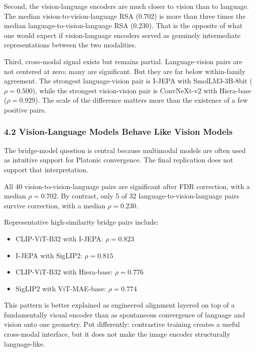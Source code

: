 \documentclass[
]{article}
\providecommand{\tightlist}{%
  \setlength{\itemsep}{0pt}\setlength{\parskip}{0pt}}
\begin{document}
Second, the vision-language encoders are much closer to vision than to
language. The median vision-to-vision-language RSA (0.702) is more than
three times the median language-to-vision-language RSA (0.230). That is
the opposite of what one would expect if vision-language encoders served
as genuinely intermediate representations between the two modalities.

Third, cross-modal signal exists but remains partial. Language-vision
pairs are not centered at zero; many are significant. But they are far
below within-family agreement. The strongest language-vision pair is
I-JEPA with SmolLM3-3B-8bit (\(\rho = 0.500\)), while the strongest
vision-vision pair is ConvNeXt-v2 with Hiera-base (\(\rho = 0.929\)).
The scale of the difference matters more than the existence of a few
positive pairs.

\subsubsection{4.2 Vision-Language Models Behave Like Vision
Models}\label{vision-language-models-behave-like-vision-models}

The bridge-model question is central because multimodal models are often
used as intuitive support for Platonic convergence. The final
replication does not support that interpretation.

All 40 vision-to-vision-language pairs are significant after FDR
correction, with a median \(\rho = 0.702\). By contrast, only 5 of 32
language-to-vision-language pairs survive correction, with a median
\(\rho = 0.230\).

Representative high-similarity bridge pairs include:

\begin{itemize}
\tightlist
\item
  CLIP-ViT-B32 with I-JEPA: \(\rho = 0.823\)
\item
  I-JEPA with SigLIP2: \(\rho = 0.815\)
\item
  CLIP-ViT-B32 with Hiera-base: \(\rho = 0.776\)
\item
  SigLIP2 with ViT-MAE-base: \(\rho = 0.774\)
\end{itemize}

This pattern is better explained as engineered alignment layered on top
of a fundamentally visual encoder than as spontaneous convergence of
language and vision onto one geometry. Put differently: contrastive
training creates a useful cross-modal interface, but it does not make
the image encoder structurally language-like.
\end{document}
